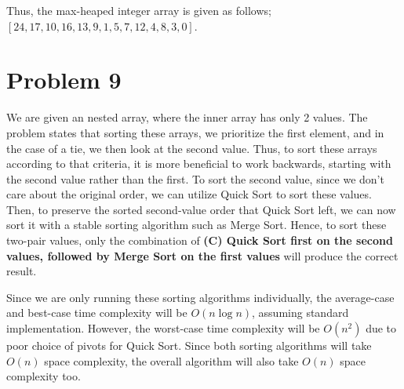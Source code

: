 \documentclass{report}
\begin{document}
Thus, the max-heaped integer array is given as follows; \\ $\boxed{[24, 17, 10, 16, 13, 9, 1, 5, 7, 12, 4, 8, 3, 0].}$

\section{Problem 9}
We are given an nested array, where the inner array has only 2 values. The problem states that sorting these arrays, we prioritize the first element, and in the case of a tie, we then look at the second value. Thus, to sort these arrays according to that criteria, it is more beneficial to work backwards, starting with the second value rather than the first. To sort the second value, since we don't care about the original order, we can utilize Quick Sort to sort these values. Then, to preserve the sorted second-value order that Quick Sort left, we can now sort it with a stable sorting algorithm such as Merge Sort. Hence, to sort these two-pair values, only the combination of \textbf{(C) Quick Sort first on the second values, followed by Merge Sort on the first values} will produce the correct result.

Since we are only running these sorting algorithms individually, the average-case and best-case time complexity will be $O(n\log n)$, assuming standard implementation. However, the worst-case time complexity will be $O(n^2)$ due to poor choice of pivots for Quick Sort. Since both sorting algorithms will take $O(n)$ space complexity, the overall algorithm will also take $O(n)$ space complexity too.

\printbibliography
\end{document}
